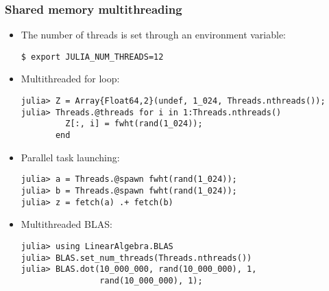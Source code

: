 \documentclass[t,usepdftitle=false]{beamer}
\begin{document}
\begin{frame}[fragile]
\frametitle{Shared memory multithreading}
\begin{itemize}
\item The number of threads is set through an environment variable:
\begin{verbatim}
$ export JULIA_NUM_THREADS=12
\end{verbatim}
\item Multithreaded for loop:
\begin{verbatim}
julia> Z = Array{Float64,2}(undef, 1_024, Threads.nthreads());
julia> Threads.@threads for i in 1:Threads.nthreads()
         Z[:, i] = fwht(rand(1_024));
       end
\end{verbatim}
\item Parallel task launching:
\begin{verbatim}
julia> a = Threads.@spawn fwht(rand(1_024));
julia> b = Threads.@spawn fwht(rand(1_024));
julia> z = fetch(a) .+ fetch(b)
\end{verbatim}
\item Multithreaded BLAS:
\begin{verbatim}
julia> using LinearAlgebra.BLAS
julia> BLAS.set_num_threads(Threads.nthreads())
julia> BLAS.dot(10_000_000, rand(10_000_000), 1, 
                rand(10_000_000), 1);
\end{verbatim}
\end{itemize}	
\end{frame}  
\end{document}
